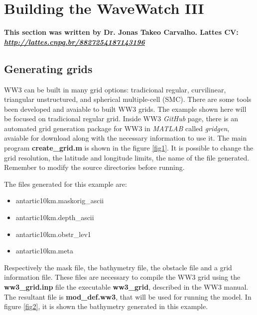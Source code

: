 \bigskip
\chapter{Building the WaveWatch III}

 \textbf{This section was written by Dr. Jonas Takeo Carvalho.  \newline Lattes CV: \textit{\textcolor{bleu_cite}{\href{http://lattes.cnpq.br/8827254187143196}{http://lattes.cnpq.br/8827254187143196}}}} 
\bigskip

\section{Generating grids}
\bigskip

 WW3 can be built in many grid options: tradicional regular, curvilinear, triangular unstructured, and spherical multiple-cell (SMC). 
There are some tools been developed and avaiable to built WW3 grids. The example shown here will be focused on tradicional regular grid. Inside 
WW3 \textit{GitHub} page, there is an automated grid generation package for WW3 in \textit{MATLAB} called \textit{gridgen}, avaiable for download along with
the necessary information to use it. The main program \textbf{create\_grid.m} is shown in the figure \textcolor{bleu_cite}{\ref{fig1}}. It is possible to change the grid resolution, 
the latitude and longitude limits, the name of the file generated. Remember to modify the source directories before running. 
\bigskip

 The files generated for this example are:
\bigskip

\begin{itemize}
    \item antartic10km.maskorig\_ascii
    \item antartic10km.depth\_ascii
    \item antartic10km.obstr\_lev1
    \item antartic10km.meta
\end{itemize}
\bigskip

 Respectively the mask file, the bathymetry file, the obstacle file and a grid information file. These files are necessary to compile the WW3 grid 
using the \textbf{{ww3\_grid.inp}} file the executable \textbf{ww3\_grid}, described in the WW3 manual. The resultant file is \textbf{mod\_def.ww3}, that will 
be used for running the model. In figure \textcolor{bleu_cite}{\ref{fig2}}, it is shown the bathymetry generated in this example.
\bigskip

